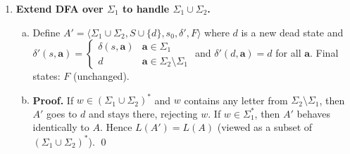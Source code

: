 \begin{enumerate}[{5.}1. ]
\begin{enumerate}[(a)]
  \begin{proof}
  $x\in L(A^{^/})$ iff $\DBAR_1(s_{0_1},x)\in F^{^/}$
  iff $\exists y\in L_2\ni\DBAR_1(\DBAR_1(s_{0_1},x),y)\in F_1$
  iff $\exists y\in L_2\ni\DBAR_1(s_{0_1},xy)\in F_1$
  iff $\exists y\in L_2\ni xy\in L_1$
  iff $x\in L_1/L_2$. \qed
  \end{proof}

  \item \textbf{Algorithm to compute $F^{^/}$.}

  For each state $t\in S_1$, determine whether $\exists y\in L_2\ni\DBAR_1(t,y)\in F_1$:
  \begin{enumerate}[1.]
    \item Build the product machine $A_1\times A_2$: state set $S_1\times S_2$, start at $\langle t,s_{0_2}\rangle$ for each $t$.
    \item In this product, run $A_2$ on the input and simultaneously advance $A_1$.
    \item State $t\in F^{^/}$ iff some state $\langle f_1,f_2\rangle$ with $f_1\in F_1$ and $f_2\in F_2$ is reachable from $\langle t,s_{0_2}\rangle$ in the product.
  \end{enumerate}
  This is a reachability computation in a finite graph, computable in $O(|S_1|\cdot|S_2|)$ time.
\end{enumerate}

\item \textbf{Extend DFA over $\Sigma_1$ to handle $\Sigma_1\cup\Sigma_2$.}

\begin{enumerate}[(a)]
  \item Define $A'=\langle\Sigma_1\cup\Sigma_2,S\cup\{d\},s_0,\delta',F\rangle$ where $d$ is a new dead state and
  $\delta'(s,\pmb{a})=\begin{cases}\delta(s,\pmb{a}) & \pmb{a}\in\Sigma_1 \\ d & \pmb{a}\in\Sigma_2\setminus\Sigma_1\end{cases}$
  and $\delta'(d,\pmb{a})=d$ for all $\pmb{a}$.  Final states: $F$ (unchanged).

  \item \textbf{Proof.}  If $w\in(\Sigma_1\cup\Sigma_2)^*$ and $w$ contains any letter from $\Sigma_2\setminus\Sigma_1$, then $A'$ goes to $d$ and stays there, rejecting $w$.  If $w\in\Sigma_1^*$, then $A'$ behaves identically to $A$.  Hence $L(A')=L(A)$ (viewed as a subset of $(\Sigma_1\cup\Sigma_2)^*$). \qed
\end{enumerate}


\end{enumerate}
